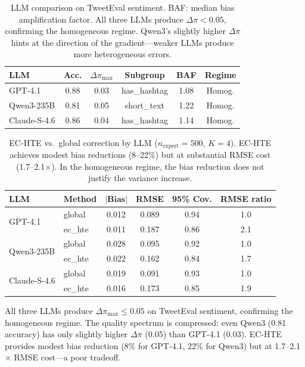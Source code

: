 \documentclass[11pt,a4paper]{article}
\begin{document}
\begin{table}[t]
\centering
\small
\begin{tabular}{@{}lccccc@{}}
\toprule
\textbf{LLM} & \textbf{Acc.} & $\Delta\pi_{\max}$ & \textbf{Subgroup} & \textbf{BAF} & \textbf{Regime} \\
\midrule
GPT-4.1 & 0.88 & 0.03 & has\_hashtag & 1.08 & Homog. \\
Qwen3-235B & 0.81 & 0.05 & short\_text & 1.22 & Homog. \\
Claude-S-4.6 & 0.86 & 0.04 & has\_hashtag & 1.14 & Homog. \\
\bottomrule
\end{tabular}
\caption{LLM comparison on TweetEval sentiment. BAF: median bias amplification factor. All three LLMs produce $\Delta\pi < 0.05$, confirming the homogeneous regime. Qwen3's slightly higher $\Delta\pi$ hints at the direction of the gradient---weaker LLMs produce more heterogeneous errors.}
\label{tab:llm_comparison}
\end{table}

\begin{table}[t]
\centering
\small
\setlength{\tabcolsep}{3pt}
\begin{tabular}{@{}llcccc@{}}
\toprule
\textbf{LLM} & \textbf{Method} & $|\textbf{Bias}|$ & \textbf{RMSE} & \textbf{95\% Cov.} & \textbf{RMSE ratio} \\
\midrule
\multirow{2}{*}{GPT-4.1} & global & 0.012 & 0.089 & 0.94 & 1.0 \\
 & ec\_hte & 0.011 & 0.187 & 0.86 & 2.1 \\
\midrule
\multirow{2}{*}{Qwen3-235B} & global & 0.028 & 0.095 & 0.92 & 1.0 \\
 & ec\_hte & 0.022 & 0.162 & 0.84 & 1.7 \\
\midrule
\multirow{2}{*}{Claude-S-4.6} & global & 0.019 & 0.091 & 0.93 & 1.0 \\
 & ec\_hte & 0.016 & 0.173 & 0.85 & 1.9 \\
\bottomrule
\end{tabular}
\caption{EC-HTE vs.\ global correction by LLM ($n_{\text{expert}}=500$, $K=4$). EC-HTE achieves modest bias reductions (8--22\%) but at substantial RMSE cost (1.7--2.1$\times$). In the homogeneous regime, the bias reduction does not justify the variance increase.}
\label{tab:llm_echte}
\end{table}

All three LLMs produce $\Delta\pi_{\max} \leq 0.05$ on TweetEval sentiment, confirming the homogeneous regime.
The quality spectrum is compressed: even Qwen3 (0.81 accuracy) has only slightly higher $\Delta\pi$ (0.05) than GPT-4.1 (0.03).
EC-HTE provides modest bias reduction (8\% for GPT-4.1, 22\% for Qwen3) but at 1.7--2.1$\times$ RMSE cost---a poor tradeoff.
\end{document}
